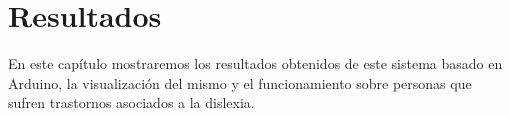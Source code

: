 \chapter{Resultados}
En este capítulo mostraremos los resultados obtenidos de este sistema basado en Arduino, la visualización del mismo y el funcionamiento sobre personas que sufren trastornos asociados a la dislexia.